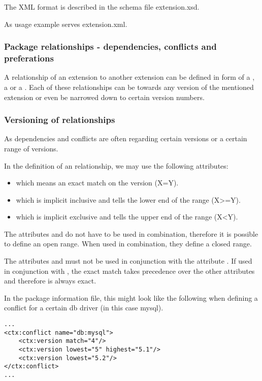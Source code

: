 The XML format is described in the schema file extension.xsd.

As usage example serves extension.xml.

\subsubsection[sec:dependencies conflicts suggestions]{Package relationships - dependencies, conflicts and preferations}

A relationship of an extension to another extension can be defined in form of a , a  or a .
Each of these relationships can be towards any version of the mentioned extension or even be narrowed down to certain version numbers.

\subsubsection[sec:versioning of relationships]{Versioning of relationships}

As dependencies and conflicts are often regarding certain versions or a certain range of versions.

In the definition of an relationship, we may use the following attributes:
\begin{itemize}
\item {} which means an exact match on the version (X=Y).
\item {} which is implicit inclusive and tells the lower end of the range (X>=Y).
\item {} which is implicit exclusive and tells the upper end of the range (X<Y).
\end{itemize}
The attributes  and  do not have to be used in combination, therefore it is possible to define an open range.
When used in combination, they define a closed range.

The attributes  and  must not be used in conjunction with the attribute . If used in conjunction with , the exact match takes precedence over the other attributes and therefore is always exact.

In the package information file, this might look like the following when defining a conflict for a certain db driver (in this case mysql).
\lstset{language=XML} 
\begin{lstlisting}[caption=XML example: conflict example mysql]
...
<ctx:conflict name="db:mysql">
    <ctx:version match="4"/>
    <ctx:version lowest="5" highest="5.1"/>
    <ctx:version lowest="5.2"/>
</ctx:conflict>
...
\end{lstlisting}

